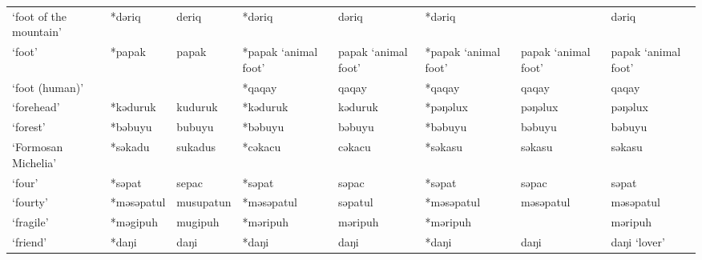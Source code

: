 \begin{landscape}
\begin{longtable}[c]{@{}p{3cm}<{\raggedright}p{2.75cm}<{\raggedright}p{2.75cm}<{\raggedright}p{2.75cm}<{\raggedright}p{2.75cm}<{\raggedright}p{2.75cm}<{\raggedright}p{2.75cm}<{\raggedright}p{2.75cm}<{\raggedright}@{}}
`foot of the mountain'                               & *dəriq       & deriq                         & *dəriq         & dəriq                      & *dəriq           &                          & dəriq                             \\
`foot'                                               & *papak       & papak                         & *papak `animal foot'        & papak `animal foot'           & *papak `animal foot'        & papak `animal foot'        & papak `animal foot'                 \\
`foot (human)'                                       &              &                               & *qaqay         & qaqay                      & *qaqay           & qaqay                    & qaqay                             \\
`forehead'                                           & *kəduruk     & kuduruk                       & *kəduruk       & kəduruk                    & *pəŋəlux         & pəŋəlux                  & pəŋəlux                           \\
`forest'                                             & *bəbuyu      & bubuyu                        & *bəbuyu        & bəbuyu                     & *bəbuyu          & bəbuyu                   & bəbuyu                            \\
`Formosan Michelia'                                  & *səkadu      & sukadus                       & *cəkacu        & cəkacu                     & *səkasu          & səkasu                   & səkasu                            \\
`four'                                               & *səpat       & sepac                         & *səpat         & səpac                      & *səpat           & səpac                    & səpat                             \\
`fourty'                                             & *məsəpatul   & musupatun                     & *məsəpatul     & səpatul                    & *məsəpatul       & məsəpatul                & məsəpatul                         \\
`fragile'                                            & *məgipuh     & mugipuh                       & *məripuh       & məripuh                    & *məripuh         &                          & məripuh                           \\
`friend'                                             & *daŋi        & daŋi                          & *daŋi          & daŋi                       & *daŋi            & daŋi                     & daŋi `lover'                      \\

\end{longtable}
\end{landscape}
